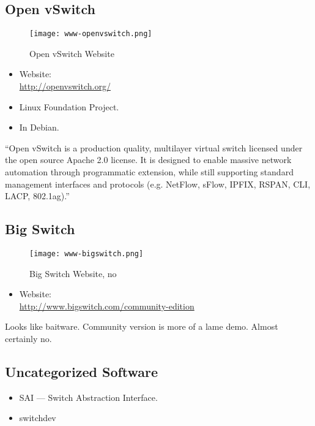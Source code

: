 \subsection{Open vSwitch}
\begin{figure}[h!]
\texttt{[image: www-openvswitch.png]}
 \caption{Open vSwitch Website}
 \label{fig:www-openvswitch}
\end{figure}


\begin{itemize}
 \item Website: \\ \url{http://openvswitch.org/}
 \item Linux Foundation Project.
 \item In Debian.
\end{itemize}


``Open vSwitch is a production quality, multilayer virtual switch licensed under the open source Apache 2.0 license.  It is designed to enable massive network automation through programmatic extension, while still supporting standard management interfaces and protocols (e.g. NetFlow, sFlow, IPFIX, RSPAN, CLI, LACP, 802.1ag).''


\subsection{Big Switch}
\begin{figure}[h!]
\texttt{[image: www-bigswitch.png]}
 \caption{Big Switch Website, no}
 \label{fig:www-bigswitch}
\end{figure}


\begin{itemize}
 \item Website: \\ \url{http://www.bigswitch.com/community-edition}
\end{itemize}


Looks like baitware. Community version is more of a lame demo.
Almost certainly no.


\subsection{Uncategorized Software}
\begin{itemize}
 \item SAI --- Switch Abstraction Interface.
 \item switchdev
\end{itemize}


